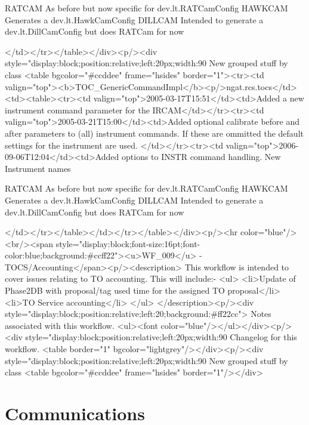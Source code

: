                RATCAM 
               As before but now specific for dev.lt.RATCamConfig
               HAWKCAM
               Generates a dev.lt.HawkCamConfig
               DILLCAM
                Intended to generate a dev.lt.DillCamConfig but does RATCam for now
             
          </td></tr></table></div><p/><div style="display:block;position:relative;left:20px;width:90%
     New grouped stuff by class
     <table bgcolor="#ccddee" frame="hsides" border="1"><tr><td valign="top"><b>TOC_GenericCommandImpl</b><p/>ngat.rcs.tocs</td><td><table><tr><td valign="top">2005-03-17T15:51</td><td>Added a new instrument command parameter for the IRCAM</td></tr><tr><td valign="top">2005-03-21T15:00</td><td>Added optional calibrate before and after parameters to (all) instrument commands.
	    If these are ommitted the default settings for the instrument are used.
	  </td></tr><tr><td valign="top">2006-09-06T12:04</td><td>Added options to INSTR command handling. New Instrument names
             
               RATCAM 
               As before but now specific for dev.lt.RATCamConfig
               HAWKCAM
               Generates a dev.lt.HawkCamConfig
               DILLCAM
                Intended to generate a dev.lt.DillCamConfig but does RATCam for now
             
          </td></tr></table></td></tr></table></div><p/><hr color="blue"/><br/><span style="display:block;font-size:16pt;font-color:blue;background:#ccff22"><u>WF_009</u> -    TOCS/Accounting</span><p/><description>           
	This workflow is intended to cover issues relating to TO accounting. This will include:-
	<ul>
	  <li>Update of Phase2DB with proposal/tag used time for the assigned TO proposal</li>
	  <li>TO Service accounting</li>
	</ul>
      </description><p/><div style="display:block;position:relative;left:20;background:#ff22cc">
      Notes associated with this workflow.
      <ul><font color="blue"/></ul></div><p/><div style="display:block;position:relative;left:20px;width:90%
      Changelog for this workflow.
      <table border="1" bgcolor="lightgrey"/></div><p/><div style="display:block;position:relative;left:20px;width:90%
     New grouped stuff by class
     <table bgcolor="#ccddee" frame="hsides" border="1"/></div>

    \section{Communications}

